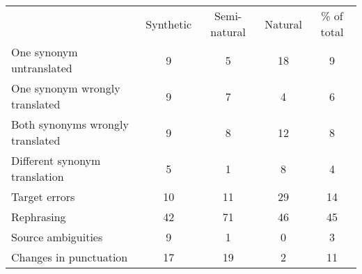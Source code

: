 \begin{tabular}{lcccc}
 & Synthetic & Semi-natural & Natural & \% of total \\
One synonym untranslated & 9 & 5 & 18 & 9\\
One synonym wrongly translated & 9 & 7 & 4 & 6\\
Both synonyms wrongly translated & 9 & 8 & 12 & 8\\
Different synonym translation & 5 & 1 & 8 & 4\\\hline
Target errors & 10 & 11 & 29 & 14\\
Rephrasing & 42 & 71 & 46 & 45\\
Source ambiguities & 9 & 1 & 0 & 3\\
Changes in punctuation & 17 & 19 & 2 & 11\\
\end{tabular}